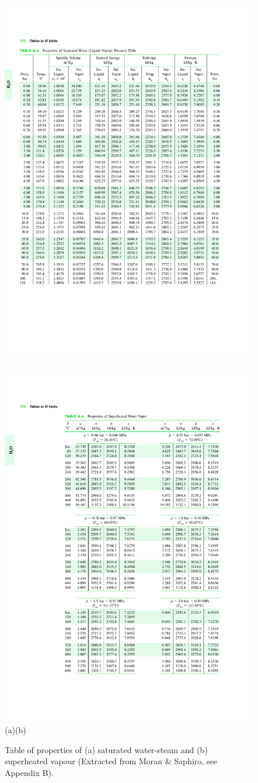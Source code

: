    \begin{figure}[h]
      \vbox{
         \hbox{\includegraphics[width=.5\columnwidth,clip]{./Figs/WaterSatTable}
               \includegraphics[width=.5\columnwidth,clip]{./Figs/Water_SuperheatedTable}}
         \vspace{-1.5cm}
         \hbox{\hspace{4cm}(a)\hspace{7cm}(b)}
      }
      \caption{ Table of properties of (a) saturated water-steam and (b) superheated vapour (Extracted from Moran $\&$ Saphiro, see Appendix B).}\label{Mod03Fig03}  
   \end{figure}
%
    

